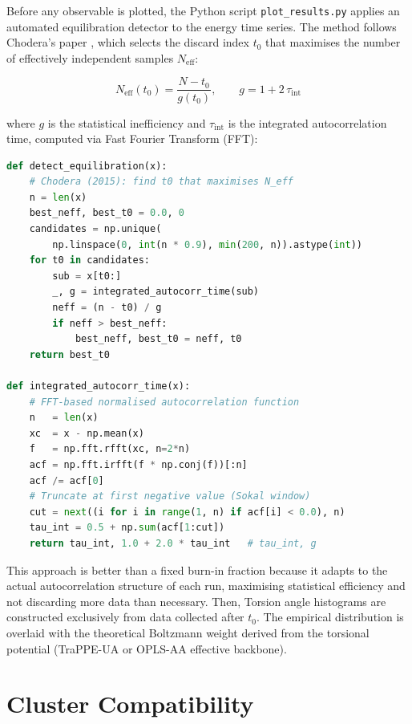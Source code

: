 \documentclass[11pt, a4paper]{article}
\begin{document}
Before any observable is plotted, the Python script \texttt{plot\_results.py}
applies an automated equilibration detector to the energy time series. The
method follows Chodera's paper \cite{chodera2015}, which selects the discard index $t_0$ that
maximises the number of effectively independent samples $N_{\text{eff}}$:

\begin{equation}
  N_{\text{eff}}(t_0) = \frac{N - t_0}{g(t_0)}, \qquad
  g = 1 + 2\,\tau_{\text{int}}
  \label{eq:neff}
\end{equation}

where $g$ is the statistical inefficiency and $\tau_{\text{int}}$ is the
integrated autocorrelation time, computed via Fast Fourier Transform (FFT):

\begin{lstlisting}[language=Python,
  caption={Equilibration detector and autocorrelation-time estimator.}]
def detect_equilibration(x):
    # Chodera (2015): find t0 that maximises N_eff
    n = len(x)
    best_neff, best_t0 = 0.0, 0
    candidates = np.unique(
        np.linspace(0, int(n * 0.9), min(200, n)).astype(int))
    for t0 in candidates:
        sub = x[t0:]
        _, g = integrated_autocorr_time(sub)
        neff = (n - t0) / g
        if neff > best_neff:
            best_neff, best_t0 = neff, t0
    return best_t0

def integrated_autocorr_time(x):
    # FFT-based normalised autocorrelation function
    n   = len(x)
    xc  = x - np.mean(x)
    f   = np.fft.rfft(xc, n=2*n)
    acf = np.fft.irfft(f * np.conj(f))[:n]
    acf /= acf[0]
    # Truncate at first negative value (Sokal window)
    cut = next((i for i in range(1, n) if acf[i] < 0.0), n)
    tau_int = 0.5 + np.sum(acf[1:cut])
    return tau_int, 1.0 + 2.0 * tau_int   # tau_int, g
\end{lstlisting}

This approach is better than a fixed burn-in fraction because it adapts to
the actual autocorrelation structure of each run, maximising statistical
efficiency and not discarding more data than necessary. Then, Torsion angle histograms are constructed exclusively from data collected after
$t_0$. The empirical distribution is overlaid with the theoretical Boltzmann
weight derived from the torsional potential (TraPPE-UA or OPLS-AA effective
backbone).


\section{Cluster Compatibility}
\label{sec:cluster}
\end{document}
